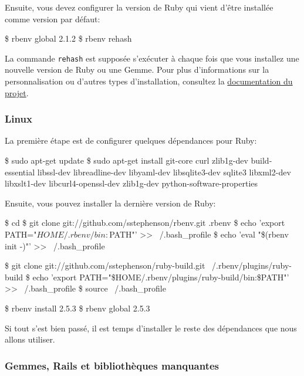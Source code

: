 \documentclass[]{report}
\begin{document}
        Ensuite, vous devez configurer la version de Ruby qui vient d'être installée comme version par défaut:

        \begin{bashcode}
        \$ rbenv global 2.1.2
        \$ rbenv rehash
        \end{bashcode}

        La commande \verb|rehash| est supposée s'exécuter à chaque fois que vous installez une nouvelle version de Ruby ou une Gemme. Pour plus d'informations sur la personnalisation ou d'autres types d'installation, consultez la \href{https://github.com/sstephenson/rbenv}{documentation du projet}.

      \subsubsection{Linux}

        La première étape est de configurer quelques dépendances pour Ruby:

        \begin{bashcode}
        \$ sudo apt-get update
        \$ sudo apt-get install git-core curl zlib1g-dev build-essential libssl-dev libreadline-dev libyaml-dev libsqlite3-dev sqlite3 libxml2-dev libxslt1-dev libcurl4-openssl-dev zlib1g-dev python-software-properties
        \end{bashcode}

        Ensuite, vous pouvez installer la dernière version de Ruby:

        \begin{bashcode}
        \$ cd
        \$ git clone git://github.com/sstephenson/rbenv.git .rbenv
        \$ echo 'export PATH="$HOME/.rbenv/bin:$PATH"' >> ~/.bash_profile
        \$ echo 'eval "\$(rbenv init -)"' >> ~/.bash_profile

        \$ git clone git://github.com/sstephenson/ruby-build.git ~/.rbenv/plugins/ruby-build
        \$ echo 'export PATH="\$HOME/.rbenv/plugins/ruby-build/bin:\$PATH"' >> ~/.bash_profile
        \$ source ~/.bash_profile

        \$ rbenv install 2.5.3
        \$ rbenv global 2.5.3
        \end{bashcode}

        Si tout s'est bien passé, il est temps d'installer le reste des dépendances que nous allons utiliser.

      \subsubsection{Gemmes, Rails et bibliothèques manquantes}
\end{document}
